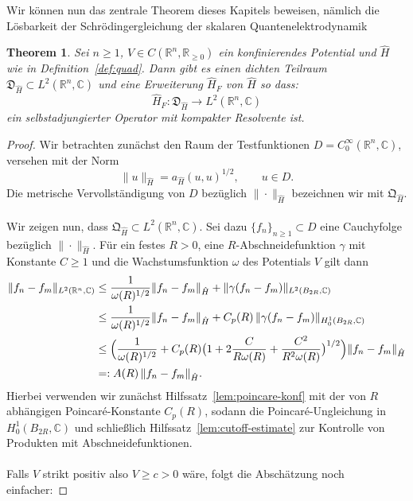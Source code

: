 \documentclass[11pt,a4paper,leqno]{report}
\newtheorem{theorem}{Theorem}[chapter]
\numberwithin{equation}{chapter}
\begin{document}
\noindent
Wir können nun das zentrale Theorem dieses Kapitels beweisen, n\"amlich die L\"osbarkeit der Schr\"odingergleichung der skalaren Quantenelektrodynamik
\begin{theorem}
	Sei \(n \geq 1\), \(V \in C(\mathbb{R}^n,\mathbb{R}_{\geq 0})\) ein konfinierendes Potential und \(\hat{H}\) wie in Definition~\ref{def:quad}. 
	Dann gibt es einen dichten Teilraum \(\mathfrak{D}_{\hat{H}} \subset L^2(\mathbb{R}^n,\mathbb{C})\) und eine Erweiterung  $\hat{H}_F$ von $\hat{H}$ so dass:
	\[
	\hat{H}_F : \mathfrak{D}_{\hat{H}} \to L^2(\mathbb{R}^n,\mathbb{C})
	\]
	ein selbstadjungierter Operator mit kompakter Resolvente ist.
\end{theorem}
\begin{proof}
	Wir betrachten zunächst den Raum der Testfunktionen \(D=C_0^\infty(\mathbb{R}^n,\mathbb{C})\), versehen mit der Norm
	\[
	\|u\|_{\hat{H}} = a_{\hat{H}}(u,u)^{1/2}, \qquad u \in D.
	\]
	Die metrische Vervollständigung von \(D\) bezüglich \(\|\cdot\|_{\hat{H}}\) bezeichnen wir mit \(\mathfrak{Q}_{\hat{H}}\).
	\\
	\\
	Wir zeigen nun, dass \(\mathfrak{Q}_{\hat{H}} \subset L^2(\mathbb{R}^n,\mathbb{C})\). Sei dazu \(\{f_n\}_{n\geq 1} \subset D\) eine Cauchyfolge bezüglich \(\|\cdot\|_{\hat{H}}\). Für ein festes \(R>0\), eine \(R\)-Abschneidefunktion \(\gamma\) mit Konstante \(C \geq 1\) und die Wachstumsfunktion \(\omega\) des Potentials \(V\) gilt dann
	\begin{align*}
		\|f_n-f_m\|_{L^2(\mathbb{R}^n,\mathbb{C})}
		&\leq \frac{1}{\omega(R)^{1/2}}\|f_n-f_m\|_{\hat{H}}
		+ \|\gamma(f_n-f_m)\|_{L^2(B_{2R},\mathbb{C})} \\
		&\leq \frac{1}{\omega(R)^{1/2}}\|f_n-f_m\|_{\hat{H}}
		+ C_p(R)\,\|\gamma(f_n-f_m)\|_{H_0^1(B_{2R},\mathbb{C})} \\
		&\leq \Bigl(\frac{1}{\omega(R)^{1/2}}
		+ C_p(R)\bigl(1 + 2\frac{C}{R\omega(R)} + \frac{C^2}{R^2\omega(R)}\bigr)^{1/2}\Bigr)
		\|f_n-f_m\|_{\hat{H}} \\
		&=: A(R)\,\|f_n-f_m\|_{\hat{H}}.
	\end{align*}
Hierbei verwenden wir zunächst Hilfssatz~\ref{lem:poincare-konf} mit der von \(R\) abhängigen Poincaré-Konstante \(C_p(R)\), sodann die Poincaré-Ungleichung in \(H_0^1(B_{2R},\mathbb{C})\) und schließlich Hilfssatz~\ref{lem:cutoff-estimate} zur Kontrolle von Produkten mit Abschneidefunktionen.
	\\
	\\
	Falls $V$ strikt positiv also $V\geq c>0$ wäre, folgt die Abschätzung noch einfacher:

\end{proof}
\end{document}

